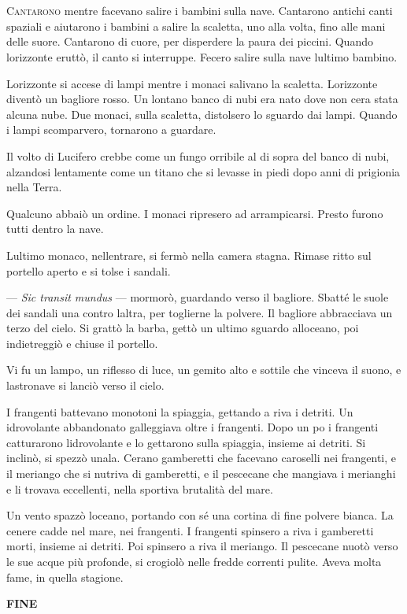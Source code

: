 	\chapter{\phantom{text}}

\lettrine{C}{antarono} mentre facevano salire i bambini sulla nave. Cantarono antichi
canti spaziali e aiutarono i bambini a salire la scaletta, uno alla
volta, fino alle mani delle suore. Cantarono di cuore, per disperdere la
paura dei piccini. Quando l\textquotesingle orizzonte eruttò, il canto
si interruppe. Fecero salire sulla nave l\textquotesingle ultimo
bambino.

L\textquotesingle orizzonte si accese di lampi mentre i monaci salivano
la scaletta. L\textquotesingle orizzonte diventò un bagliore rosso. Un
lontano banco di nubi era nato dove non c\textquotesingle era stata
alcuna nube. Due monaci, sulla scaletta, distolsero lo sguardo dai
lampi. Quando i lampi scomparvero, tornarono a guardare.

Il volto di Lucifero crebbe come un fungo orribile al di sopra del banco
di nubi, alzandosi lentamente come un titano che si levasse in piedi
dopo anni di prigionia nella Terra.

Qualcuno abbaiò un ordine. I monaci ripresero ad arrampicarsi. Presto
furono tutti dentro la nave.

L\textquotesingle ultimo monaco, nell\textquotesingle entrare, si fermò
nella camera stagna. Rimase ritto sul portello aperto e si tolse i
sandali.

--- \emph{Sic transit mundus} --- mormorò, guardando verso il bagliore.
Sbatté le suole dei sandali una contro l\textquotesingle altra, per
toglierne la polvere. Il bagliore abbracciava un terzo del cielo. Si
grattò la barba, gettò un ultimo sguardo all\textquotesingle oceano, poi
indietreggiò e chiuse il portello.

Vi fu un lampo, un riflesso di luce, un gemito alto e sottile che
vinceva il suono, e l\textquotesingle astronave si lanciò verso il
cielo.

I frangenti battevano monotoni la spiaggia, gettando a riva i detriti.
Un idrovolante abbandonato galleggiava oltre i frangenti. Dopo un
po\textquotesingle{} i frangenti catturarono
l\textquotesingle idrovolante e lo gettarono sulla spiaggia, insieme ai
detriti. Si inclinò, si spezzò un\textquotesingle ala.
C\textquotesingle erano gamberetti che facevano caroselli nei frangenti,
e il meriango che si nutriva di gamberetti, e il pescecane che mangiava
i merianghi e li trovava eccellenti, nella sportiva brutalità del mare.

Un vento spazzò l\textquotesingle oceano, portando con sé una cortina di
fine polvere bianca. La cenere cadde nel mare, nei frangenti. I
frangenti spinsero a riva i gamberetti morti, insieme ai detriti. Poi
spinsero a riva il meriango. Il pescecane nuotò verso le sue acque più
profonde, si crogiolò nelle fredde correnti pulite. Aveva molta fame, in
quella stagione.

\hfill\break

\hfill\break

\hfill\break

\begin{center}
	\textbf{FINE}
\end{center}